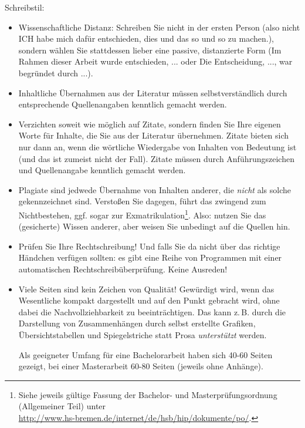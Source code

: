 \documentclass[11pt]{scrartcl}
\newcommand{\qto}[1]{\glqq #1\grqq}				%
\newcommand{\zB}{\mbox{z.\,B.}\xspace}
\newcommand{\ggf}{ggf.\xspace}
\begin{document}
\noindent
Schreibstil:
	\begin{itemize}
		\item Wissenschaftliche Distanz: Schreiben Sie nicht in der ersten Person (also nicht \qto{ICH habe mich dafür entschieden, dies und das so und so zu machen.}), sondern wählen Sie stattdessen lieber eine passive, distanzierte Form (\qto{Im Rahmen dieser Arbeit wurde entschieden, ...} oder \qto{Die Entscheidung, ..., war begründet durch ...}).
		\item Inhaltliche Übernahmen aus der Literatur müssen selbstverständlich durch entsprechende Quellenangaben kenntlich gemacht werden. 
		\item Verzichten soweit wie möglich auf Zitate, sondern finden Sie Ihre eigenen Worte für Inhalte, die Sie aus der Literatur übernehmen. Zitate bieten sich nur dann an, wenn die wörtliche Wiedergabe von Inhalten von Bedeutung ist (und das ist zumeist nicht der Fall). Zitate müssen durch Anführungszeichen und Quellenangabe kenntlich gemacht werden.
		\item Plagiate sind jedwede Übernahme von Inhalten anderer, die \emph{nicht} als solche gekennzeichnet sind. Verstoßen Sie dagegen, führt das zwingend zum Nichtbestehen, \ggf sogar zur Exmatrikulation\footnote{Siehe jeweils gültige Fassung der Bachelor- und Masterprüfungsordnung (Allgemeiner Teil) unter\\ \url{http://www.hs-bremen.de/internet/de/hsb/hip/dokumente/po/}.}. Also: nutzen Sie das (gesicherte) Wissen anderer, aber weisen Sie unbedingt auf die Quellen hin.
		\item Prüfen Sie Ihre Rechtschreibung! Und falls Sie da nicht über das richtige Händchen verfügen sollten: es gibt eine Reihe von Programmen mit einer automatischen Rechtschreibüberprüfung. Keine Ausreden!
		\item Viele Seiten sind kein Zeichen von Qualität! Gewürdigt wird, wenn das Wesentliche kompakt dargestellt und auf den Punkt gebracht wird, ohne dabei die Nachvollziehbarkeit zu beeinträchtigen. Das kann \zB durch die Darstellung von Zusammenhängen durch selbst erstellte Grafiken, Übersichtstabellen und Spiegelstriche statt Prosa \emph{unterstützt} werden. 
		
		Als geeigneter Umfang für eine Bachelorarbeit haben sich 40-60 Seiten gezeigt, bei einer Masterarbeit 60-80 Seiten (jeweils ohne Anhänge).
	\end{itemize}
	
\end{document}
